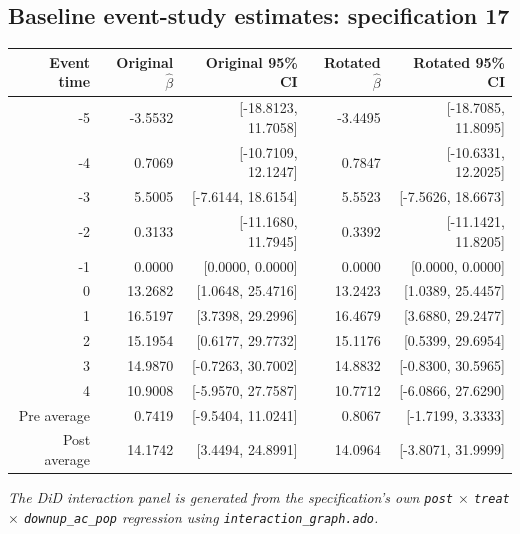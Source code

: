 \documentclass[10pt]{article}
\begin{document}
\subsection*{Baseline event-study estimates: specification 17}
\begin{center}
\scriptsize
\begin{tabular}{r rr rr}
\toprule
Event time & Original $\hat\beta$ & Original 95\% CI & Rotated $\hat\beta$ & Rotated 95\% CI \\
\midrule
-5 & -3.5532 & [-18.8123, 11.7058] & -3.4495 & [-18.7085, 11.8095] \\
-4 & 0.7069 & [-10.7109, 12.1247] & 0.7847 & [-10.6331, 12.2025] \\
-3 & 5.5005 & [-7.6144, 18.6154] & 5.5523 & [-7.5626, 18.6673] \\
-2 & 0.3133 & [-11.1680, 11.7945] & 0.3392 & [-11.1421, 11.8205] \\
-1 & 0.0000 & [0.0000, 0.0000] & 0.0000 & [0.0000, 0.0000] \\
0 & 13.2682 & [1.0648, 25.4716] & 13.2423 & [1.0389, 25.4457] \\
1 & 16.5197 & [3.7398, 29.2996] & 16.4679 & [3.6880, 29.2477] \\
2 & 15.1954 & [0.6177, 29.7732] & 15.1176 & [0.5399, 29.6954] \\
3 & 14.9870 & [-0.7263, 30.7002] & 14.8832 & [-0.8300, 30.5965] \\
4 & 10.9008 & [-5.9570, 27.7587] & 10.7712 & [-6.0866, 27.6290] \\
\midrule
Pre average & 0.7419 & [-9.5404, 11.0241] & 0.8067 & [-1.7199, 3.3333] \\
Post average & 14.1742 & [3.4494, 24.8991] & 14.0964 & [-3.8071, 31.9999] \\
\bottomrule
\end{tabular}
\end{center}
\medskip
\textit{The DiD interaction panel is generated from the specification's own \texttt{post} $\times$ \texttt{treat} $\times$ \texttt{downup\_ac\_pop} regression using \texttt{interaction\_graph.ado}.}
\clearpage
\end{document}
